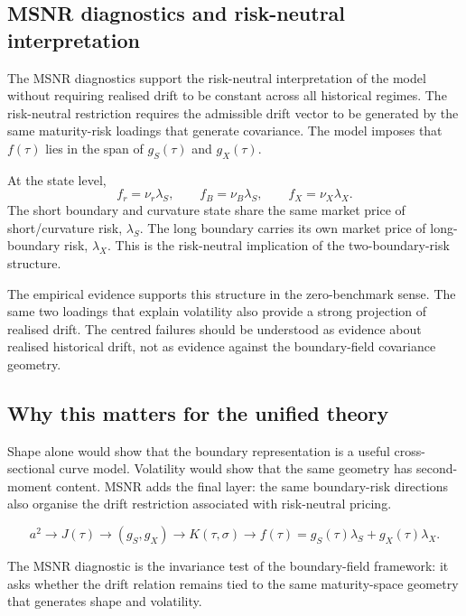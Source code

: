 \documentclass[11pt]{article}
\begin{document}
\subsection{MSNR diagnostics and risk-neutral interpretation}

The MSNR diagnostics support the risk-neutral interpretation of the model without requiring realised drift to be constant across all historical regimes. The risk-neutral restriction requires the admissible drift vector to be generated by the same maturity-risk loadings that generate covariance. The model imposes that $f(\tau)$ lies in the span of $g_S(\tau)$ and $g_X(\tau)$.

At the state level,
\begin{equation}
  f_r=\nu_r\lambda_S,
  \qquad
  f_B=\nu_B\lambda_S,
  \qquad
  f_X=\nu_X\lambda_X.
\end{equation}
The short boundary and curvature state share the same market price of short/curvature risk, $\lambda_S$. The long boundary carries its own market price of long-boundary risk, $\lambda_X$. This is the risk-neutral implication of the two-boundary-risk structure.

The empirical evidence supports this structure in the zero-benchmark sense. The same two loadings that explain volatility also provide a strong projection of realised drift. The centred failures should be understood as evidence about realised historical drift, not as evidence against the boundary-field covariance geometry.

\subsection{Why this matters for the unified theory}

Shape alone would show that the boundary representation is a useful cross-sectional curve model. Volatility would show that the same geometry has second-moment content. MSNR adds the final layer: the same boundary-risk directions also organise the drift restriction associated with risk-neutral pricing.

\begin{equation}
  a^2 \longrightarrow J(\tau) \longrightarrow (g_S,g_X) \longrightarrow K(\tau,\sigma)
  \longrightarrow f(\tau)=g_S(\tau)\lambda_S+g_X(\tau)\lambda_X.
  \label{eq:empirical-chain}
\end{equation}

The MSNR diagnostic is the invariance test of the boundary-field framework: it asks whether the drift relation remains tied to the same maturity-space geometry that generates shape and volatility.
\end{document}
